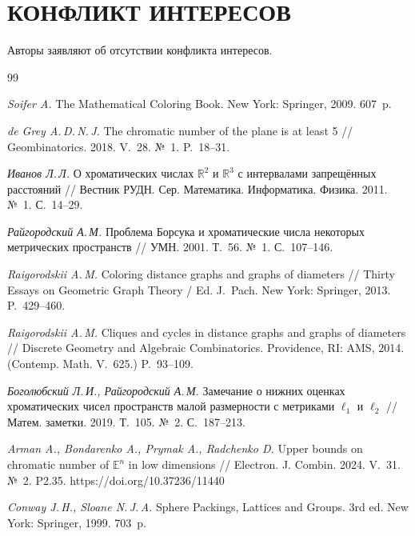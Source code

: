 \documentclass{article}
\theoremstyle{plain}
\theoremstyle{remark}
\newcommand{\R}{\mathbb{R}}
\begin{document}
\section*{КОНФЛИКТ ИНТЕРЕСОВ}

Авторы заявляют об отсутствии конфликта интересов.

\begin{thebibliography}{99}

\textit{Soifer A.}
The Mathematical Coloring Book. New York: Springer, 2009. 607~p.

\textit{de Grey A.\,D.\,N.\,J.}
The chromatic number of the plane is at least 5 //
Geombinatorics. 2018. V.~28. №~1. P.~18--31.

\textit{Иванов Л.\,Л.}
О хроматических числах $\R^2$ и $\R^3$ с интервалами запрещённых
расстояний // Вестник РУДН. Сер. Математика. Информатика. Физика. 2011.
№~1. С.~14--29.

\textit{Райгородский А.\,М.}
Проблема Борсука и хроматические числа некоторых метрических пространств //
УМН. 2001. Т.~56. №~1. С.~107--146.

\textit{Raigorodskii A.\,M.}
Coloring distance graphs and graphs of diameters // Thirty Essays on
Geometric Graph Theory / Ed. J.~Pach. New York: Springer, 2013. P.~429--460.

\textit{Raigorodskii A.\,M.}
Cliques and cycles in distance graphs and graphs of diameters // Discrete
Geometry and Algebraic Combinatorics. Providence, RI: AMS, 2014.
(Contemp. Math. V.~625.) P.~93--109.

\textit{Боголюбский Л.\,И., Райгородский А.\,М.}
Замечание о нижних оценках хроматических чисел пространств малой
размерности с метриками $\ell_1$ и $\ell_2$ // Матем. заметки. 2019.
Т.~105. №~2. С.~187--213.

\textit{Arman A., Bondarenko A., Prymak A., Radchenko D.}
Upper bounds on chromatic number of $\mathbb E^n$ in low dimensions //
Electron. J. Combin. 2024. V.~31. №~2. P2.35.
https://doi.org/10.37236/11440

\textit{Conway J.\,H., Sloane N.\,J.\,A.}
Sphere Packings, Lattices and Groups. 3rd ed. New York: Springer, 1999.
703~p.

\end{thebibliography}

\renewcommand\refname{References}
\end{document}
